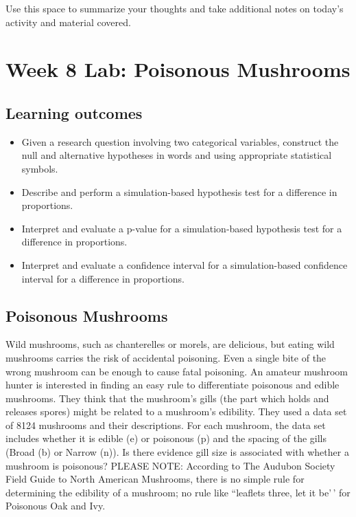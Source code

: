 \documentclass[
]{report}
\begin{document}
Use this space to summarize your thoughts and take additional notes on today's activity and material covered.

\newpage

\hypertarget{week-8-lab-poisonous-mushrooms}{%
\section{Week 8 Lab: Poisonous Mushrooms}\label{week-8-lab-poisonous-mushrooms}}


\hypertarget{learning-outcomes-16}{%
\subsection{Learning outcomes}\label{learning-outcomes-16}}

\begin{itemize}
\item
  Given a research question involving two categorical variables, construct the null and alternative hypotheses
  in words and using appropriate statistical symbols.
\item
  Describe and perform a simulation-based hypothesis test for a difference in proportions.
\item
  Interpret and evaluate a p-value for a simulation-based hypothesis test for a difference in proportions.
\item
  Interpret and evaluate a confidence interval for a simulation-based confidence interval for a difference in proportions.
\end{itemize}

\hypertarget{poisonous-mushrooms}{%
\subsection{Poisonous Mushrooms}\label{poisonous-mushrooms}}

Wild mushrooms, such as chanterelles or morels, are delicious, but eating wild mushrooms carries the risk of accidental poisoning. Even a single bite of the wrong mushroom can be enough to cause fatal poisoning. An amateur mushroom hunter is interested in finding an easy rule to differentiate poisonous and edible mushrooms. They think that the mushroom's gills (the part which holds and releases spores) might be related to a mushroom's edibility. They used a data set of 8124 mushrooms and their descriptions. For each mushroom, the data set includes whether it is edible (e) or poisonous (p) and the spacing of the gills (Broad (b) or Narrow (n)). Is there evidence gill size is associated with whether a mushroom is poisonous? PLEASE NOTE: According to The Audubon Society Field Guide to North American Mushrooms, there is no simple rule for determining the edibility of a mushroom; no rule like ``leaflets three, let it be'\,' for Poisonous Oak and Ivy.
\end{document}
